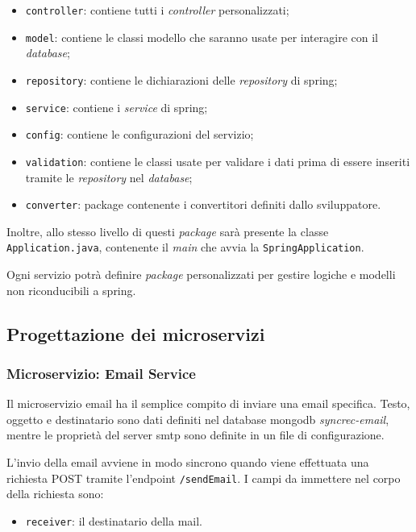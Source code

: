 \begin{itemize}
	\item \texttt{controller}: contiene tutti i \textit{controller} personalizzati;
	\item \texttt{model}: contiene le classi modello che saranno usate per interagire con il \textit{database};
	\item \texttt{repository}: contiene le dichiarazioni delle \textit{repository} di \gls{spring};
	\item \texttt{service}: contiene i \textit{service} di \gls{spring};
	\item \texttt{config}: contiene le configurazioni del servizio;
	\item \texttt{validation}: contiene le classi usate per validare i dati prima di essere inseriti tramite le \textit{repository} nel \textit{database};
	\item \texttt{converter}: package contenente i convertitori definiti dallo sviluppatore.
\end{itemize}

Inoltre, allo stesso livello di questi \textit{package} sarà presente la classe \texttt{Application.java}, contenente il \textit{main}
che avvia la \texttt{SpringApplication}.

Ogni servizio potrà definire \textit{package} personalizzati per gestire logiche e modelli non riconducibili a \gls{spring}.

\subsection{Progettazione dei microservizi}\label{prog-microservizi}

\subsubsection{Microservizio: Email Service}

Il \gls{microservizio} email ha il semplice compito di inviare una email specifica.
Testo, oggetto e destinatario sono dati definiti nel database \gls{mongodb}
\textit{syncrec-email}, mentre le proprietà del server \acrshort{smtp} sono definite in un file di configurazione.

L'invio della email avviene in modo sincrono quando viene effettuata una richiesta POST tramite l'endpoint \texttt{/sendEmail}.
I campi da immettere nel corpo della richiesta sono:
\begin{itemize}
	\item \texttt{receiver}: il destinatario della mail.
\end{itemize}

